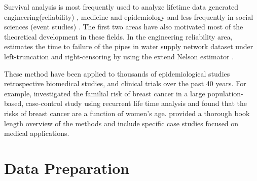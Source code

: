 Survival analysis is most frequently used to analyze lifetime data generated engineering(reliability) \citep{lawless2011,meeker2014,holt2011}, medicine and epidemiology \citep{kalbfleisch2011} and less frequently in social sciences (event studies) \citep{allison2010,long2006}.  The first two areas have also motivated most of the theoretical development in these fields. 
In the engineering reliability area, \citet{carrion2010} estimates the time to failure of the pipes in water supply network dataset under left-truncation and right-censoring by using the extend Nelson estimator \citep{pan1998}.

These method have been applied to thousands of epidemiological studies retrospective biomedical studies, and clinical trials over the past 40 years. For example, \citet{claus1991} investigated the familial risk of breast cancer in a large population-based, case-control study using recurrent life time analysis and found that the risks of breast cancer are a function of women's age.  \citet{Kleinmoeschberger2003} provided a thorough book length overview of the methods and include specific case studies focused on medical applications.

\section{Data Preparation}\label{data.desc}

